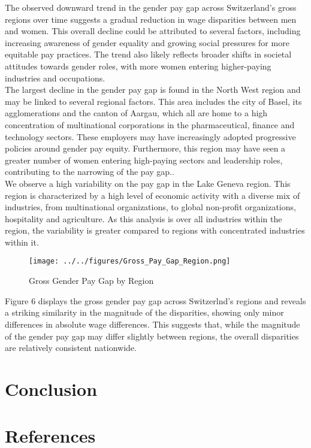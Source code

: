 \documentclass{article}
\begin{document}
The observed downward trend in the gender pay gap across Switzerland's gross regions over time suggests a gradual reduction in wage disparities between men and women. This overall decline could be attributed to several factors, including increasing awareness of gender equality and growing social pressures for more equitable pay practices. The trend also likely reflects broader shifts in societal attitudes towards gender roles, with more women entering higher-paying industries and occupations.\\
The largest decline in the gender pay gap is found in the North West region and may be linked to several regional factors. This area includes the city of Basel, its agglomerations and the canton of Aargau, which all are home to a high concentration of multinational corporations in the pharmaceutical, finance and technology sectors. These employers may have increasingly adopted progressive policies around gender pay equity. Furthermore, this region may have seen a greater number of women entering high-paying sectors and leadership roles, contributing to the narrowing of the pay gap..\\
We observe a high variability on the pay gap in the Lake Geneva region. This region is characterized by a high level of economic activity with a diverse mix of industries, from multinational organizations, to global non-profit organizations, hospitality and agriculture. As this analysis is over all industries within the region, the variability is greater compared to regions with concentrated industries within it. \\


\begin{figure}[h]
    \centering
    \texttt{[image: ../../figures/Gross\_Pay\_Gap\_Region.png]}
    \caption{Gross Gender Pay Gap by Region}
    \label{fig:rates_time}
\end{figure}

Figure 6 displays the gross gender pay gap across Switzerlnd's regions and reveals a striking similarity in the magnitude of the disparities, showing only minor differences in absolute wage differences. This suggests that, while the magnitude of the gender pay gap may differ slightly between regions, the overall disparities are relatively consistent nationwide.






\section{Conclusion}

\newpage  %
\section{References}
\printbibliography[heading=none] 
\end{document}
